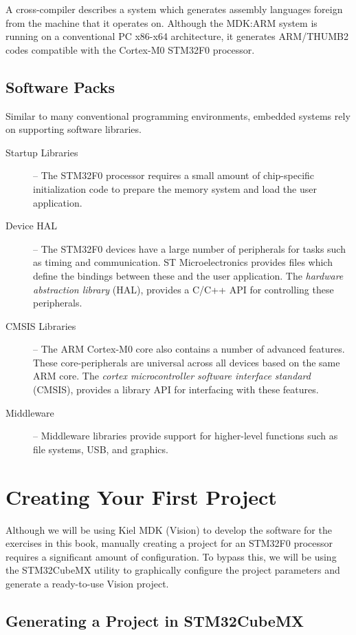 \documentclass[11pt,fleqn]{book} %
\begin{document}
A cross-compiler describes a system which generates assembly languages foreign from the machine that it operates on. Although the MDK:ARM system is running on a conventional PC x86-x64 architecture, it generates ARM/THUMB2 codes compatible with the Cortex-M0 STM32F0 processor.

\subsection*{Software Packs}
Similar to many conventional programming environments, embedded systems rely on supporting software libraries. 

\begin{description}
	\item[Startup Libraries] -- The STM32F0 processor requires a small amount of chip-specific initialization code to prepare the memory system and load the user application.  
	\item[Device HAL] -- The STM32F0 devices have a large number of peripherals for tasks such as timing and communication. ST Microelectronics provides files which define the bindings between these and the user application. The \textit{hardware abstraction library} (HAL), provides a C/C++ API for controlling these peripherals.
	\item[CMSIS Libraries] -- The ARM Cortex-M0 core also contains a number of advanced features. These core-peripherals are universal across all devices based on the same ARM core. The \textit{cortex microcontroller software interface standard} (CMSIS), provides a library API for interfacing with these features. 
	\item[Middleware] -- Middleware libraries provide support for higher-level functions such as file systems, USB, and graphics.
\end{description}

\section{Creating Your First Project}
Although we will be using Kiel MDK ({\textmu}Vision) to develop the software for the exercises in this book, manually creating a project for an STM32F0 processor requires a significant amount of configuration. To bypass this, we will be using the STM32CubeMX utility to graphically configure the project parameters and generate a ready-to-use {\textmu}Vision project. 

\subsection{Generating a Project in STM32CubeMX}
\end{document}
